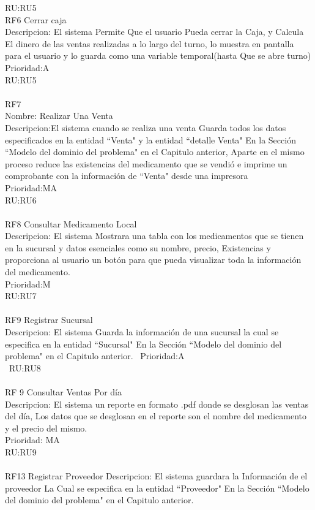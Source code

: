 RU:RU5
\\
RF6 Cerrar caja\\
Descripcion: El sistema Permite Que el usuario Pueda cerrar la Caja, y Calcula El dinero de las ventas realizadas a lo largo del turno, lo muestra en pantalla para el usuario y lo guarda como una variable temporal(hasta Que se abre turno)\\
Prioridad:A\\
RU:RU5\\
\\
RF7\\
Nombre: Realizar Una Venta\\
Descripcion:El sistema cuando se realiza una venta Guarda todos los datos especificados en la entidad ``Venta" y la entidad ``detalle Venta" En la Sección ``Modelo del dominio del problema" en el  Capitulo anterior, Aparte en el mismo proceso reduce las existencias del medicamento que se vendió e imprime un comprobante con la información de ``Venta" desde una impresora\\
Prioridad:MA\\
RU:RU6\\
\\
RF8 Consultar Medicamento Local\\
Descripcion: El sistema Mostrara una tabla con los medicamentos que se tienen en la sucursal y datos esenciales como su nombre, precio, Existencias y proporciona al usuario un botón para que pueda visualizar toda la información del medicamento.\\
Prioridad:M\\
RU:RU7\\
\\
RF9 Registrar Sucursal\\
Descripcion: El sistema Guarda la información de una sucursal la cual se especifica en la entidad ``Sucursal" En la Sección ``Modelo del dominio del problema" en el  Capitulo anterior. \
Prioridad:A\\\
RU:RU8\\
\\
RF 9 Consultar Ventas Por día\\
Descripcion: El sistema un reporte en formato .pdf donde se desglosan las ventas del día, Los datos que se desglosan en el reporte son el nombre del medicamento y el precio del mismo.\\
Prioridad: MA\\
RU:RU9\\
\\
RF13 Registrar Proveedor
Descripcion: El sistema guardara la Información de el proveedor La Cual se especifica en la entidad ``Proveedor" En la Sección ``Modelo del dominio del problema" en el  Capitulo anterior.\\
